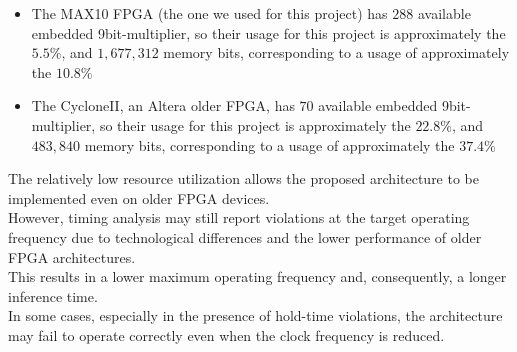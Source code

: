 \begin{itemize}
    \setlength\itemsep{0pt}
    \setlength\parskip{0pt}
    \item The MAX10 FPGA (the one we used for this project) has \(288\) available embedded 9bit-multiplier, so their usage for this project is approximately the \(5.5\%\), and \(1,677,312\) memory bits, corresponding to a usage of approximately the \(10.8\%\)
    \item The CycloneII, an Altera older FPGA, has \(70\) available embedded 9bit-multiplier,  so their usage for this project is approximately the \(22.8\%\), and \(483,840\) memory bits, corresponding to a usage of approximately the \(37.4\%\)
\end{itemize}

\noindent
The relatively low resource utilization allows the proposed architecture to be implemented even on older FPGA devices. \\
However, timing analysis may still report violations at the target operating frequency due to technological differences and the lower performance of older FPGA architectures. \\
This results in a lower maximum operating frequency and, consequently, a longer inference time. \\
In some cases, especially in the presence of hold-time violations, the architecture may fail to operate correctly even when the clock frequency is reduced.
